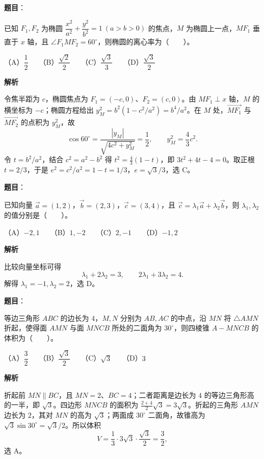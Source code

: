 \begin{answer}

\textbf{题目}：

已知 $F_1,F_2$ 为椭圆 $\dfrac{x^2}{a^2}+\dfrac{y^2}{b^2}=1\ (a>b>0)$ 的焦点，$M$ 为椭圆上一点，$MF_1$ 垂直于 $x$ 轴，且 $\angle F_1MF_2=60^\circ$，则椭圆的离心率为\mbox{（　　）}。

（A）$\dfrac{1}{2}$　　（B）$\dfrac{\sqrt{2}}{2}$　　（C）$\dfrac{\sqrt{3}}{3}$　　（D）$\dfrac{\sqrt{3}}{2}$

\textbf{解析}

令焦半距为 $c$，椭圆焦点为 $F_1=(-c,0)$、$F_2=(c,0)$。由 $MF_1\perp x$ 轴，$M$ 的横坐标为 $-c$；椭圆方程给出 $y_M^2=b^2(1-c^2/a^2)=b^4/a^2$。在 $M$ 处，$\overrightarrow{MF_1}$ 与 $\overrightarrow{MF_2}$ 的点积为 $y_M^2$，故
\nopagebreak[4]
\[
\cos60^\circ=\frac{|y_M|}{\sqrt{4c^2+y_M^2}}=\frac12,
\qquad y_M^2=\frac43c^2.
\]
令 $t=b^2/a^2$，结合 $c^2=a^2-b^2$ 得 $t^2=\frac43(1-t)$，即 $3t^2+4t-4=0$。取正根 $t=2/3$，于是 $e^2=c^2/a^2=1-t=1/3$，$e=\sqrt3/3$，选 C。


\end{answer}
\begin{answer}

\textbf{题目}：

已知向量 $\vec a=(1,2)$，$\vec b=(2,3)$，$\vec c=(3,4)$，且 $\vec c=\lambda_1\vec a+\lambda_2\vec b$，则 $\lambda_1,\lambda_2$ 的值分别是\mbox{（　　）}。

（A）$-2,1$　　（B）$1,-2$　　（C）$2,-1$　　（D）$-1,2$

\textbf{解析}

比较向量坐标可得
\nopagebreak[4]
\[
\lambda_1+2\lambda_2=3,\qquad 2\lambda_1+3\lambda_2=4.
\]
解得 $\lambda_1=-1,\lambda_2=2$，选 D。


\end{answer}
\begin{answer}

\textbf{题目}：

等边三角形 $ABC$ 的边长为 $4$，$M,N$ 分别为 $AB,AC$ 的中点，沿 $MN$ 将 $\triangle AMN$ 折起，使得面 $AMN$ 与面 $MNCB$ 所处的二面角为 $30^\circ$，则四棱锥 $A-MNCB$ 的体积为\mbox{（　　）}。

（A）$\dfrac{3}{2}$　　（B）$\dfrac{\sqrt{3}}{2}$　　（C）$\sqrt{3}$　　（D）$3$

\textbf{解析}

折起前 $MN\parallel BC$，且 $MN=2$、$BC=4$；二者距离是边长为 $4$ 的等边三角形高的一半，即 $\sqrt3$。四边形 $MNCB$ 的面积为 $\frac{2+4}{2}\sqrt3=3\sqrt3$。折起的三角形 $AMN$ 边长为 $2$，其对 $MN$ 的高为 $\sqrt3$；两面成 $30^\circ$ 二面角，故锥高为 $\sqrt3\sin30^\circ=\sqrt3/2$。所以体积
\nopagebreak[4]
\[
V=\frac13\cdot3\sqrt3\cdot\frac{\sqrt3}{2}=\frac32,
\]
选 A。


\end{answer}
